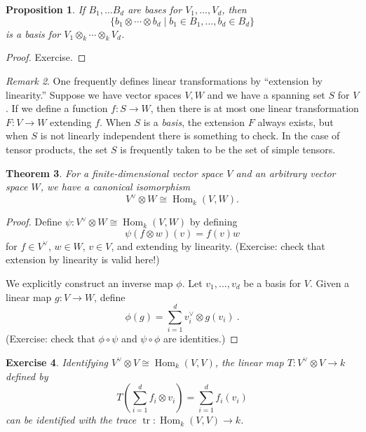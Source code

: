 \documentclass[12pt]{article}
\theoremstyle{plain}
\newtheorem{theorem}{Theorem}[section]
\newtheorem{proposition}[theorem]{Proposition}
\newtheorem{exercise}[theorem]{Exercise}
\theoremstyle{definition}
\theoremstyle{remark}
\newtheorem{remark}[theorem]{Remark}
\numberwithin{equation}{section}
\begin{document}
\begin{proposition}
If $B_1,\ldots B_d$ are bases for $V_1,\ldots,V_d$, then
\[
\{ b_1 \otimes \cdots \otimes b_d \mid b_1 \in B_1, \ldots, b_d \in B_d
\}
\]
is a basis for $V_1 \otimes_k \cdots \otimes_k V_d$.
\end{proposition}

\begin{proof}
Exercise.
\end{proof}

\begin{remark}
One frequently defines linear transformations by
``extension by linearity.''
Suppose we have vector spaces $V,W$ and we have a spanning
set $S$ for $V$.  If we define a function $f : S \to W$,
then there is at most one linear transformation $F : V \to W$
extending $f$.  When $S$ is a \emph{basis}, the extension $F$ always exists,
but when $S$ is not linearly independent there is something to check.
In the case of tensor products, the set $S$ is frequently taken to be
the set of simple tensors.
\end{remark}

\begin{theorem}
For a finite-dimensional vector space $V$ and an arbitrary vector space
$W$, we have a canonical isomorphism
\[
V^\vee \otimes W \cong \operatorname{Hom}_k(V,W) .
\]
\end{theorem}

\begin{proof}
Define $\psi : V^\vee \otimes W \cong \operatorname{Hom}_k(V,W)$
by defining
\[
\psi(f \otimes w)(v) = f(v)w
\]
for $f \in V^\vee$, $w \in W$, $v \in V$, and extending by linearity.
(Exercise: check that extension by linearity is valid here!)

We explicitly construct an inverse map $\phi$.
Let $v_1,\ldots, v_d$ be a basis for $V$.
Given a linear map $g : V \to W$, define
\[
\phi(g) = \sum_{i=1}^d v^\vee_i \otimes g(v_i) \ .
\]
(Exercise: check that $\phi \circ \psi$ and $\psi \circ \phi$ are
identities.)
\end{proof}

\begin{exercise}
Identifying $V^\vee \otimes V \cong \operatorname{Hom}_k(V,V)$,
the linear map $T: V^\vee \otimes V \to k$ defined by
\[
T\left( \sum_{i=1}^d f_i \otimes v_i\right)
= \sum_{i=1}^d f_i(v_i)
\]
can be identified with the trace $\operatorname{tr} :
\operatorname{Hom}_k(V,V) \to k$.
\end{exercise}
\end{document}
